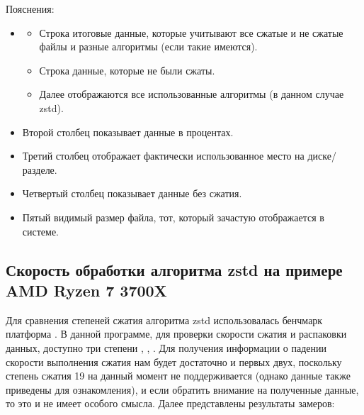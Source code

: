 \documentclass[letterpaper,10pt,russian,openany]{sphinxmanual}
\begin{document}
\sphinxAtStartPar
Пояснения:
\begin{itemize}
\item {} \begin{description}
\begin{itemize}
\item {} 
\sphinxAtStartPar
Строка  \sphinxhyphen{} итоговые данные, которые учитывают все сжатые и не сжатые файлы и разные алгоритмы (если такие имеются).

\item {} 
\sphinxAtStartPar
Строка  \sphinxhyphen{} данные, которые не были сжаты.

\item {} 
\sphinxAtStartPar
Далее отображаются все использованные алгоритмы (в данном случае \sphinxhyphen{} zstd).

\end{itemize}

\end{description}

\item {} 
\sphinxAtStartPar
Второй столбец показывает данные в процентах.

\item {} 
\sphinxAtStartPar
Третий столбец отображает фактически использованное место на диске/разделе.

\item {} 
\sphinxAtStartPar
Четвертый столбец показывает данные без сжатия.

\item {} 
\sphinxAtStartPar
Пятый \sphinxhyphen{} видимый размер файла, тот, который зачастую отображается в системе.

\end{itemize}

\ignorespaces 

\subsection{Скорость обработки алгоритма zstd на примере AMD Ryzen 7 3700X}
\label{\detokenize{source/file-systems:zstd-amd-ryzen-7-3700x}}\label{\detokenize{source/file-systems:zstd-compression-test}}\label{\detokenize{source/file-systems:index-4}}
\sphinxAtStartPar
Для сравнения степеней сжатия алгоритма zstd использовалась бенчмарк платформа .
В данной программе, для проверки скорости сжатия и распаковки данных, доступно три степени \sphinxhyphen{} , , .
Для получения информации о падении скорости выполнения сжатия нам будет достаточно и первых двух, поскольку степень сжатия 19 на данный момент не поддерживается
(однако данные также приведены для ознакомления), и если обратить внимание на полученные данные, то это и не имеет особого смысла. Далее представлены результаты замеров:
\end{document}
